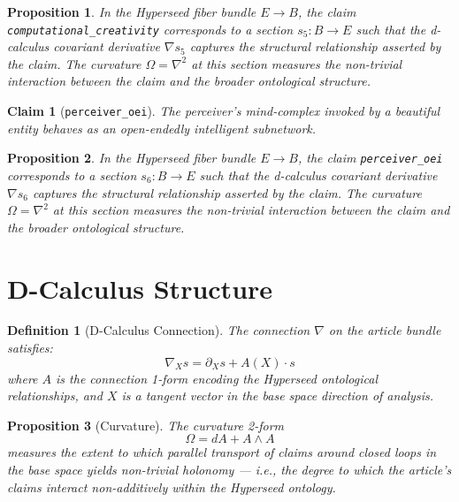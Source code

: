 \documentclass{article}
\newtheorem{claim}{Claim}
\newtheorem{definition}{Definition}
\newtheorem{proposition}{Proposition}
\begin{document}
\begin{proposition}
In the Hyperseed fiber bundle $E \to B$, the claim \texttt{computational_creativity} corresponds to a section $s_5: B \to E$ such that the d-calculus covariant derivative $\nabla s_5$ captures the structural relationship asserted by the claim. The curvature $\Omega = \nabla^2$ at this section measures the non-trivial interaction between the claim and the broader ontological structure.
\end{proposition}

\begin{claim}[\texttt{perceiver_oei}]
The perceiver's mind-complex invoked by a beautiful entity behaves as an open-endedly intelligent subnetwork.
\end{claim}

\begin{proposition}
In the Hyperseed fiber bundle $E \to B$, the claim \texttt{perceiver_oei} corresponds to a section $s_6: B \to E$ such that the d-calculus covariant derivative $\nabla s_6$ captures the structural relationship asserted by the claim. The curvature $\Omega = \nabla^2$ at this section measures the non-trivial interaction between the claim and the broader ontological structure.
\end{proposition}

\section{D-Calculus Structure}

\begin{definition}[D-Calculus Connection]
The connection $\nabla$ on the article bundle satisfies:
\begin{equation}
  \nabla_X s = \partial_X s + A(X) \cdot s
\end{equation}
where $A$ is the connection 1-form encoding the Hyperseed ontological relationships, and $X$ is a tangent vector in the base space direction of analysis.
\end{definition}

\begin{proposition}[Curvature]
The curvature 2-form
\begin{equation}
  \Omega = dA + A \wedge A
\end{equation}
measures the extent to which parallel transport of claims around closed loops in the base space yields non-trivial holonomy --- i.e., the degree to which the article's claims interact non-additively within the Hyperseed ontology.
\end{proposition}
\end{document}
